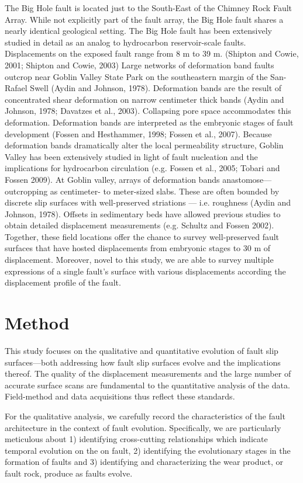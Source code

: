 \documentclass[12pt,a4paper]{article}
\begin{document}
The Big Hole fault is located just to the South-East of the Chimney Rock Fault Array. While not explicitly part of the fault array, the Big Hole fault shares a nearly identical geological setting. The Big Hole fault has been extensively studied in detail as an analog to hydrocarbon reservoir-scale faults. Displacements on the exposed fault range from 8 m to 39 m. (Shipton and Cowie, 2001; Shipton and Cowie, 2003) 
	Large networks of deformation band faults outcrop near Goblin Valley State Park on the southeastern margin of the San-Rafael Swell (Aydin and Johnson, 1978). Deformation bands are the result of concentrated shear deformation on narrow centimeter thick bands (Aydin and Johnson, 1978; Davatzes et al., 2003). Collapsing pore space accommodates this deformation. Deformation bands are interpreted as the embryonic stages of fault development (Fossen and Hesthammer, 1998; Fossen et al., 2007). Because deformation bands dramatically alter the local permeability structure, Goblin Valley has been extensively studied in light of fault nucleation and the implications for hydrocarbon circulation (e.g. Fossen et al., 2005; Tobari and Fossen 2009). At Goblin valley, arrays of deformation bands anastomose—outcropping as centimeter- to meter-sized slabs.  These are often bounded by discrete slip surfaces with well-preserved striations — i.e. roughness (Aydin and Johnson, 1978). Offsets in sedimentary beds have allowed previous studies to obtain detailed displacement measurements (e.g. Schultz and Fossen 2002). 
Together, these field locations offer the chance to survey well-preserved fault surfaces that have hosted displacements from embryonic stages to 30 m of displacement. Moreover, novel to this study, we are able to survey multiple expressions of a single fault’s surface with various displacements according the displacement profile of the fault. 

\section{Method}

This study focuses on the qualitative and quantitative evolution of fault slip surfaces—both addressing how fault slip surfaces evolve and the implications thereof. The quality of the displacement measurements and the large number of accurate surface scans are fundamental to the quantitative analysis of the data. Field-method and data acquisitions thus reflect these standards. 

For the qualitative analysis, we carefully record the characteristics of the fault architecture in the context of fault evolution. Specifically, we are particularly meticulous about 1) identifying cross-cutting relationships which indicate temporal evolution on the on fault, 2) identifying the evolutionary stages in the formation of faults and 3) identifying and characterizing the wear product, or fault rock, produce as faults evolve. 
\end{document}
